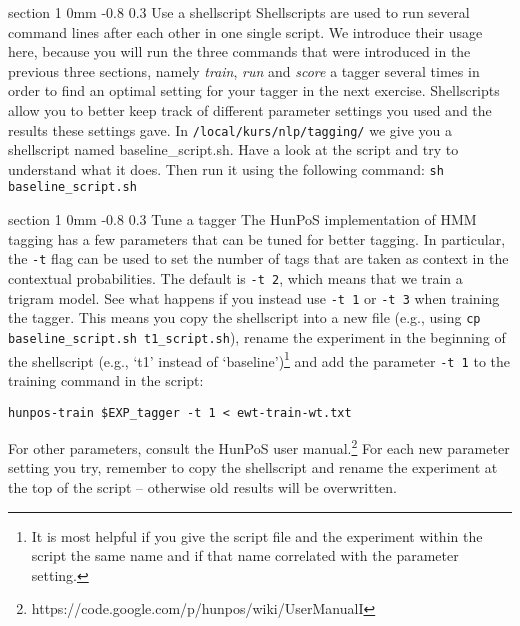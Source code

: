 \documentclass[11pt]{article}
\makeatletter
\newcommand{\newsec}[2]{\section{#1}\label{sec:#2}\noindent}
\renewcommand{\section}{\@startsection
{section}%
{1}%
{0mm}%
{-0.8\baselineskip}%
{0.3\baselineskip}%
{\bfseries\large}}%
\makeatother
\begin{document}
\newsec{Use a shellscript}{shell}%
Shellscripts are used to run several command lines after each other in
one single script. We introduce their usage here, because you will run
the three commands that were introduced in the previous three
sections, namely \emph{train}, \emph{run} and \emph{score} a tagger
several times in order to find an optimal setting for your tagger in
the next exercise. Shellscripts allow you to better keep track of
different parameter settings you used and the results these settings
gave. In \texttt{/local/kurs/nlp/tagging/} we give you a shellscript
named baseline\_script.sh. Have a look at the script and try to
understand what it does. Then run it using the following command:
\texttt{sh baseline\_script.sh}
%
%
%
%
%
%

\newsec{Tune a tagger}{tune}%
The HunPoS implementation of HMM tagging has a few parameters that can
be tuned for better tagging. In particular, the {\tt -t} flag can be
used to set the number of tags that are taken as context in the
contextual probabilities. The default is {\tt -t
  $\!\!$2}, which means that we train a trigram model. See what
happens if you instead use {\tt -t $\!\!$1} or {\tt -t
  $\!\!$3} when training the tagger. This means you copy the
shellscript into a new file (e.g., using \texttt{cp baseline\_script.sh
  t1\_script.sh}), rename the experiment in the beginning of the
shellscript (e.g., `t1' instead of `baseline')\footnote{It is most
  helpful if you give the script file and the experiment within the
  script the same name and if that name correlated with the parameter
  setting.} and add the parameter \texttt{-t 1} to the training
command in the script:
\begin{verbatim}
hunpos-train $EXP_tagger -t 1 < ewt-train-wt.txt
\end{verbatim}
For other parameters, consult the HunPoS user manual.\footnote{https://code.google.com/p/hunpos/wiki/UserManualI}
For each new parameter setting you try, remember to copy the shellscript and
rename the experiment at the top of the script -- otherwise old results will be overwritten.
\end{document}
